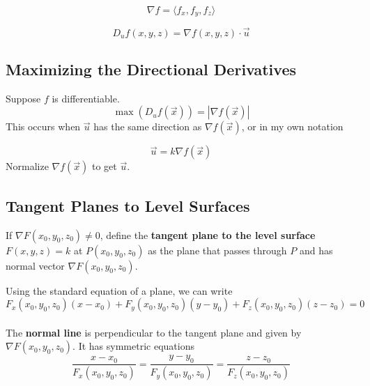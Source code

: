 \documentclass{report}  %
\begin{document}
\begin{equation}
	\nabla f= \langle f_x , f_y , f_z \rangle
\end{equation}

\begin{equation}
	D_u f(x, y, z) = \nabla f(x, y, z) \cdot \vec{u}
\end{equation}

\subsection*{Maximizing the Directional Derivatives}
Suppose $f$ is differentiable. 
\begin{equation}
	\max(D_u f(\vec{x})) = |\nabla f(\vec{x})|
\end{equation}
This occurs when $\vec{u}$ has the same direction as $\nabla f(\vec{x})$, or in my own notation

\begin{equation}
	\vec{u} = k \nabla f(\vec{x})
\end{equation}
Normalize $\nabla f(\vec{x})$ to get $\vec{u}$. 

\subsection*{Tangent Planes to Level Surfaces}
If $\nabla F(x_0, y_0, z_0) \ne 0$, define the \textbf{tangent plane to the level surface} $F(x, y, z) = k$ at $P(x_0, y_0, z_0)$ as the plane that passes through $P$ and has normal vector $\nabla F(x_0, y_0, z_0)$. 

Using the standard equation of a plane, we can write 
\begin{equation}
	F_x (x_0, y_0, z_0) (x-x_0) + 
	F_y (x_0, y_0, z_0) (y-y_0) + 
	F_z (x_0, y_0, z_0) (z-z_0) = 0
\end{equation} \\

The \textbf{normal line} is perpendicular to the tangent plane and given by 
$\nabla F(x_0, y_0, z_0)$. It has symmetric equations
\begin{equation}
	\frac{x-x_0}{F_x (x_0, y_0, z_0)} = 
	\frac{y-y_0}{F_y (x_0, y_0, z_0)} = 
	\frac{z-z_0}{F_z (x_0, y_0, z_0)}
\end{equation}
\end{document}
